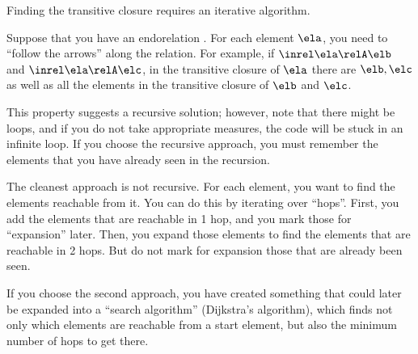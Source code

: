 
\begin{hint}
    Finding the transitive closure requires an iterative algorithm.

    Suppose that you have an endorelation \relA.
    For each element $\ela$, you need to ``follow the arrows'' along the relation.
    For example, if  $\inrel \ela \relA \elb$ and  $\inrel \ela \relA \elc$, in the transitive closure of $\ela$ there are $\elb, \elc$ as well as all the elements in the transitive closure of $\elb$ and $\elc$.

    This property suggests a recursive solution; however, note that there might be loops, and if you do not take appropriate measures, the code will be stuck in an infinite loop.
    If you choose the recursive approach, you must remember the elements that you have already seen in the recursion.

    The cleanest approach is not recursive.
    For each element, you want to find the elements reachable from it.
    You can do this by iterating over ``hops''.
    First, you add the elements that are reachable in 1 hop, and you mark those for ``expansion'' later.
    Then, you expand those elements to find the elements that are reachable in 2 hops.
    But do not mark for expansion those that are already been seen.

    If you choose the second approach, you have created something that could later be expanded into a ``search algorithm'' (Dijkstra's algorithm), which finds not only which elements are reachable from a start element, but also the minimum number of hops to get there.
\end{hint}
